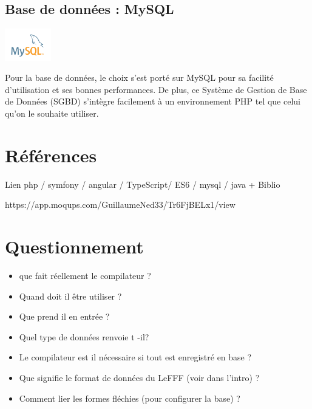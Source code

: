 \documentclass[12pt,a4paper]{article}
\begin{document}
\subsection{Base de données : MySQL}
\begin{center}
  \includegraphics[width=2cm]{img/mysql.png}
\end{center}
Pour la base de données, le choix s'est porté sur MySQL pour sa facilité d'utilisation et ses bonnes performances. 
De plus, ce Système de Gestion de Base de Données (SGBD) s'intègre facilement à un environnement PHP tel que celui qu'on le souhaite utiliser.

\section{Références}
Lien php / symfony / angular / TypeScript/ ES6 / mysql / java
+ Biblio

https://app.moqups.com/GuillaumeNed33/Tr6FjBELx1/view
 

\section{Questionnement}
\begin{itemize}  
  \item que fait réellement le compilateur ?
  \item Quand doit il être utiliser ?
  \item Que prend il en entrée ?
  \item Quel type de données renvoie t -il?
  \item Le compilateur est il nécessaire si tout est enregistré en base ?
  \item Que signifie le format de données du LeFFF (voir dans l'intro) ?
  \item Comment lier les formes fléchies (pour configurer la base) ?
\end{itemize}
\end{document}
